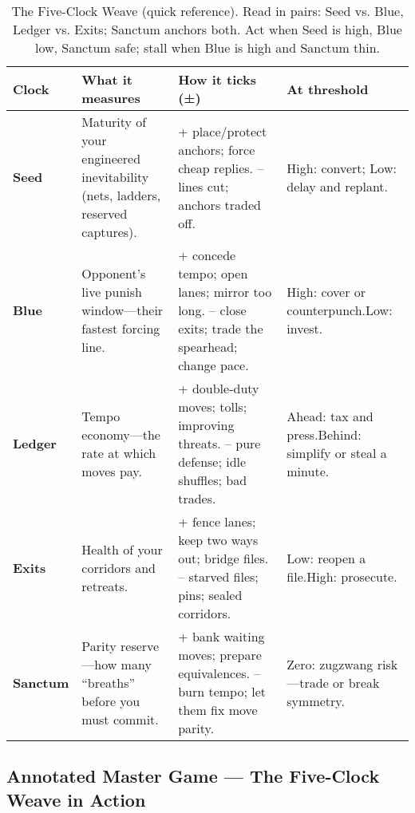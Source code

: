\documentclass[11pt]{article}
\renewcommand{\arraystretch}{1.15}
\begin{document}
\begin{table}[h]
\centering
\renewcommand{\arraystretch}{1.1}
\begin{tabular}{p{2.6cm} p{5.2cm} p{5.0cm} p{3.2cm}}
\hline
\textbf{Clock} & \textbf{What it measures} & \textbf{How it ticks (±)} & \textbf{At threshold} \\
\hline
\textbf{Seed} &
Maturity of your engineered inevitability (nets, ladders, reserved captures). &
{+ place/protect anchors; force cheap replies.\newline
-- lines cut; anchors traded off.} &
High: convert; Low: delay and replant. \\
\hline
\textbf{Blue} &
Opponent’s live punish window—their fastest forcing line. &
{+ concede tempo; open lanes; mirror too long.\newline
-- close exits; trade the spearhead; change pace.} &
High: cover or counterpunch.\newline Low: invest. \\
\hline
\textbf{Ledger} &
Tempo economy—the rate at which moves pay. &
{+ double-duty moves; tolls; improving threats.\newline
-- pure defense; idle shuffles; bad trades.} &
Ahead: tax and press.\newline Behind: simplify or steal a minute. \\
\hline
\textbf{Exits} &
Health of your corridors and retreats. &
{+ fence lanes; keep two ways out; bridge files.\newline
-- starved files; pins; sealed corridors.} &
Low: reopen a file.\newline High: prosecute. \\
\hline
\textbf{Sanctum} &
Parity reserve—how many “breaths” before you must commit. &
{+ bank waiting moves; prepare equivalences.\newline
-- burn tempo; let them fix move parity.} &
Zero: zugzwang risk—trade or break symmetry. \\
\hline
\end{tabular}
\caption{The Five-Clock Weave (quick reference). Read in pairs: Seed vs. Blue, Ledger vs. Exits; Sanctum anchors both. Act when Seed is high, Blue low, Sanctum safe; stall when Blue is high and Sanctum thin.}
\end{table}

\clearpage

\subsection*{Annotated Master Game — The Five-Clock Weave in Action}
\label{sec:annotated-five-breath}
\end{document}
